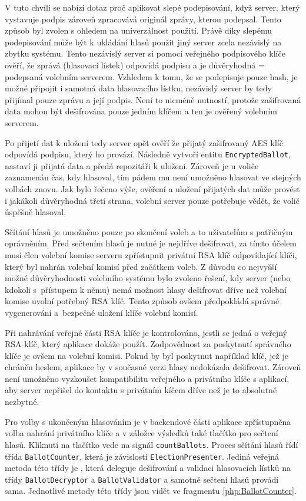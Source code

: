 
V tuto chvíli se nabízí dotaz proč aplikovat slepé podepisování, když server, který vystavuje podpis zároveň zpracovává originál zprávy, kterou podepsal. Tento způsob byl zvolen s ohledem na univerzálnost použití. Právě díky slepému podepisování může být k ukládání hlasů použit jiný server zcela nezávislý na zbytku systému. Tento nezávislý server si pomocí veřejného podpisového klíče ověří, že zprává (hlasovací lístek) odpovídá podpisu a je důvěryhodná = podepsaná volebním serverem. Vzhledem k tomu, že se podepisuje pouze hash, je možné připojit i samotná data hlasovacího lístku, nezávislý server by tedy přijímal pouze zprávu a její podpis. Není to nicméně nutností, protože zašifrovaná data mohou být dešifrována pouze jedním klíčem a ten je ověřený volebním serverem.

Po přijetí dat k uložení tedy server opět ověří že přijatý zašifrovaný AES klíč odpovídá podpisu, který ho provází. Následně vytvoří entitu \texttt{EncryptedBallot}, nastaví ji přijatá data a předá repozitáři k uložení. Zároveň je u voliče zaznamenán čas, kdy hlasoval, tím pádem mu není umožněno hlasovat ve stejných volbách znovu. Jak bylo řečeno výše, ověření a uložení přijatých dat může provést i jakákoli důvěryhodná třetí strana, volební server pouze potřebuje vědět, že volič úspěšně hlasoval.

Sčítání hlasů je umožněno pouze po skončení voleb a to uživatelům s patřičným oprávněním. Před sečtením hlasů je nutné je nejdříve dešifrovat, za tímto účelem musí člen volební komise serveru zpřístupnit privátní RSA klíč odpovídající klíči, který byl nahrán volební komisí před začátkem voleb. Z důvodu co nejvyšší možné důvěryhodnosti volebního systému bylo zvoleno řešení, kdy server (nebo kdokoli s~přístupem k němu) nemá možnost hlasy dešifrovat dříve než volební komise uvolní potřebný RSA klíč. Tento způsob ovšem předpokládá správné vygenerování a~bezpečné uložení klíče volební komisí.

Při nahrávání veřejné části RSA klíče je kontrolováno, jestli se jedná o veřejný RSA klíč, který aplikace dokáže použít. Zodpovědnost za poskytnutí správného klíče je ovšem na volební komisi. Pokud by byl poskytnut například klíč, jež je chráněn heslem, aplikace by v současné verzi hlasy nedokázala dešifrovat. Zároveň není umožněno vyzkoušet kompatibilitu veřejného a privátního klíče s aplikací, aby server nepřišel do kontaktu s privátním kíčem dříve než je to absolutně nezbytné.

Pro volby s ukončeným hlasováním je v backendové části aplikace zpřístupněna volba nahrání privátního klíče a v záložce výsledků také tlačítko pro sečtení hlasů. Kliknutí na tlačítko vede na signál \texttt{countBallots}. Proces sčítání hlasů řídí třída \texttt{BallotCounter}, která je závislostí \texttt{ElectionPresenter}. Jediná veřejná metoda této třídy je %
, která deleguje dešifrování a validaci hlasovacích lístků na třídy \texttt{BallotDecryptor} a \texttt{BallotValidator} a samotné sečtení hlasů provádí sama. Jednotlivé metody této třídy jsou vidět ve fragmentu \ref{php:BallotCounter}.

